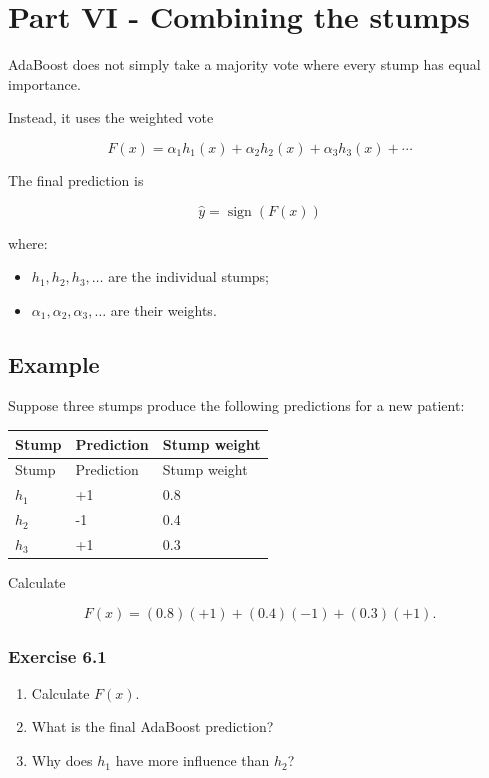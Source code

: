 \documentclass{course_sheet}
\begin{document}
\section*{Part VI - Combining the stumps}
AdaBoost does not simply take a majority vote where every stump has equal importance.

Instead, it uses the weighted vote

\[
{
F(x)
=
\alpha_1h_1(x)
+
\alpha_2h_2(x)
+
\alpha_3h_3(x)+\cdots
}
\]

The final prediction is

\[
{
\hat y=\operatorname{sign}(F(x))
}
\]

where:

\begin{itemize}
\item
$h_1,h_2,h_3,\ldots$ are the individual stumps;

\item
$\alpha_1,\alpha_2,\alpha_3,\ldots$ are their weights.

\end{itemize}
\subsection*{Example}
Suppose three stumps produce the following predictions for a new patient:

\begingroup
\small
\setlength{\tabcolsep}{4pt}
\begin{longtable}{l|l|l}
Stump & Prediction & Stump weight \\[1.5pt]
\hline
\endfirsthead
Stump & Prediction & Stump weight \\[1.5pt]
\hline
\endhead
$h_1$ & +1 & 0.8 \\[1.5pt]
$h_2$ & -1 & 0.4 \\[1.5pt]
$h_3$ & +1 & 0.3 \\[1.5pt]
\end{longtable}
\endgroup
Calculate

\[
F(x)
=
(0.8)(+1)+(0.4)(-1)+(0.3)(+1).
\]

\subsubsection*{Exercise 6.1}
\begin{enumerate}
\item
Calculate $F(x)$.

\item
What is the final AdaBoost prediction?

\item
Why does $h_1$ have more influence than $h_2$?

\end{enumerate}
\clearpage
\end{document}
